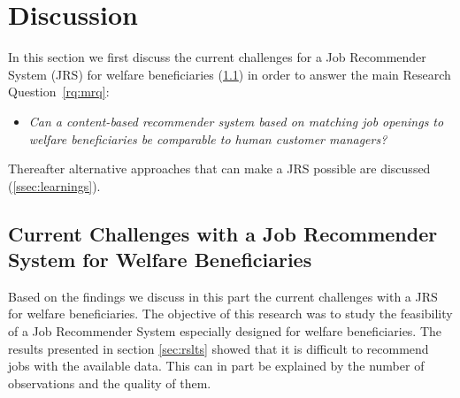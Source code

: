 \section{Discussion}
\label{sec:disc}
In this section we first discuss the current challenges for a Job Recommender System (JRS) for 
welfare beneficiaries (\ref{ssec:jrswb}) in order to answer the main Research Question~\ref{rq:mrq}: 
\begin{itemize}
	\item[] \em Can a content-based recommender system based on matching job openings to welfare beneficiaries be comparable to human customer managers?
\end{itemize}
Thereafter alternative approaches that can make a JRS possible are discussed (\ref{ssec:learnings}). 

\subsection{Current Challenges with a Job Recommender System for Welfare Beneficiaries}
\label{ssec:jrswb}
Based on the findings we discuss in this part the current challenges with a JRS for welfare beneficiaries.
The objective of this research was to study the feasibility of a Job Recommender System especially designed for welfare beneficiaries. 
The results presented in section \ref{sec:rslts} showed that it is difficult to recommend jobs with the available data.
This can in part be explained by the number of observations and the quality of them.

